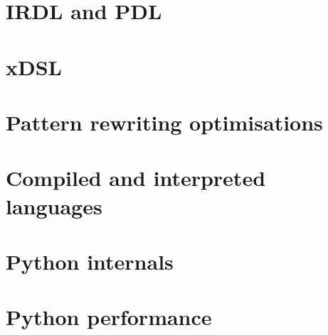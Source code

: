 \section{IRDL and PDL}
\label{sec:irdl}

\section{xDSL}
\label{sec:xdsl}

\section{Pattern rewriting optimisations}
\label{sec:pattern-rewriting}


\section{Compiled and interpreted languages}
\label{sec:compiled-interpreted-languages}


\section{Python internals}
\label{sec:python-internals}



\section{Python performance}
\label{sec:python-performance}




